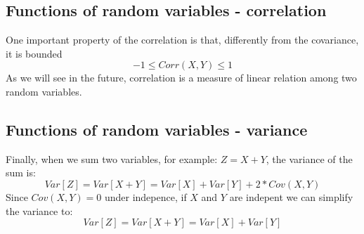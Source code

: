 \documentclass[11pt]{article}
\begin{document}
	\subsection*{Functions of random variables - correlation}
	One important property of the correlation is that, differently from the covariance, it is bounded
	\[ -1 \leq Corr(X,Y) \leq 1\]
	As we will see in the future, correlation is a measure of linear relation among two random variables.

	\subsection*{Functions of random variables - variance}
	Finally, when we sum two variables, for example: $Z=X+Y$, the variance of the sum is:
	\[Var[Z] = Var[X+Y] = Var[X] + Var[Y] + 2*Cov(X,Y)\]
	Since $Cov(X,Y) = 0$ under indepence, if $X$ and $Y$ are indepent we can simplify the variance to:
	\[Var[Z] = Var[X+Y] = Var[X] + Var[Y]\]
\end{document}
